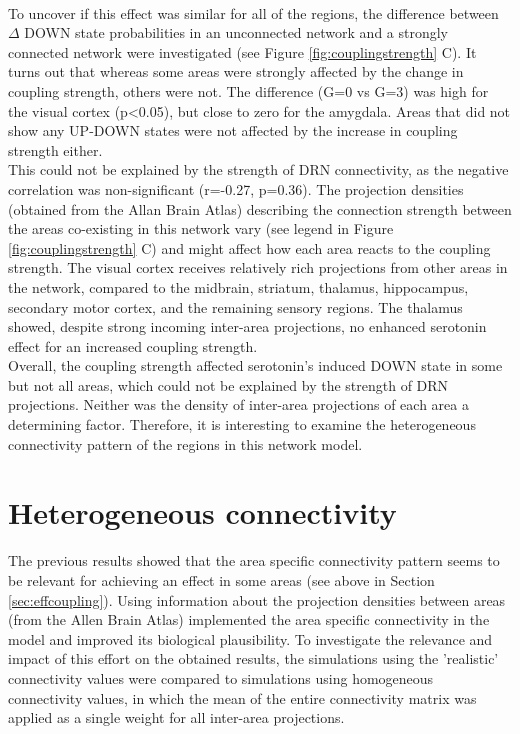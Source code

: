 \\
\indent To uncover if this effect was similar for all of the regions, the difference between $\Delta$ DOWN state probabilities in an unconnected network and a strongly connected network were investigated (see Figure \ref{fig:couplingstrength} C). It turns out that whereas some areas were strongly affected by the change in coupling strength, others were not. The difference (G=0 vs G=3) was high for the visual cortex (p<0.05), but close to zero for the amygdala. Areas that did not show any UP-DOWN states were not affected by the increase in coupling strength either.
\\
\indent This could not be explained by the strength of DRN connectivity, as the negative correlation was non-significant (r=-0.27, p=0.36). The projection densities (obtained from the Allan Brain Atlas) describing the connection strength between the areas co-existing in this network vary (see legend in Figure \ref{fig:couplingstrength} C) and might affect how each area reacts to the coupling strength. The visual cortex receives relatively rich projections from other areas in the network, compared to the midbrain, striatum, thalamus, hippocampus, secondary motor cortex, and the remaining sensory regions. The thalamus showed, despite strong incoming inter-area projections, no enhanced serotonin effect for an increased coupling strength.   
\\
\indent Overall, the coupling strength affected serotonin's induced DOWN state in some but not all areas, which could not be explained by the strength of DRN projections. Neither was the density of inter-area projections of each area a determining factor. Therefore, it is interesting to examine the heterogeneous connectivity pattern of the regions in this network model.

\section{Heterogeneous connectivity}\label{sec:heterogconnect}
\noindent
\indent The previous results showed that the area specific connectivity pattern seems to be relevant for achieving an effect in some areas (see above in Section \ref{sec:effcoupling}). Using information about the projection densities between areas (from the Allen Brain Atlas) implemented the area specific connectivity in the model and improved its biological plausibility. To investigate the relevance and impact of this effort on the obtained results, the simulations using the 'realistic' connectivity values were compared to simulations using homogeneous connectivity values, in which the mean of the entire connectivity matrix was applied as a single weight for all inter-area projections. 



